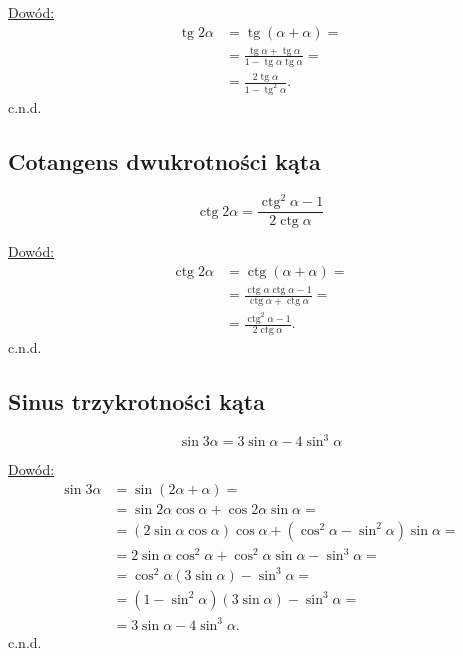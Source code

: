 \documentclass[12pt,a4paper,fleqn]{article}
\DeclareMathOperator{\tg}{tg}
\DeclareMathOperator{\ctg}{ctg}
\begin{document}
		\underline{Dowód:} \noindent
		\begin{align*}
		\tg2\alpha &= \tg(\alpha+\alpha)= \\
				   &= \frac{\tg \alpha + \tg \alpha}{1 - \tg \alpha \tg \alpha} =\\
				   &=\frac{2\tg \alpha}{1 - \tg^2 \alpha}.
		\end{align*}
		c.n.d.

		\subsection{Cotangens dwukrotności kąta}
		\begin{equation*}
			\ctg2\alpha = \frac{\ctg^2\alpha-1}{2\ctg\alpha}
		\end{equation*}
		
		\underline{Dowód:} \noindent
		\begin{align*}
			\ctg2\alpha &= \ctg(\alpha+\alpha) =\\
						&= \frac{\ctg\alpha\ctg\alpha-1}{\ctg\alpha+\ctg\alpha} =\\
						&= \frac{\ctg^2\alpha-1}{2\ctg\alpha}.
		\end{align*}
		c.n.d.
		
		\subsection{Sinus trzykrotności kąta}
		\begin{equation*}
			\sin3\alpha = 3\sin\alpha -4\sin^3\alpha
		\end{equation*}
		
		\underline{Dowód:} \noindent
		\begin{align*}
			\sin3\alpha &= \sin(2\alpha+\alpha) = \\
						  &= \sin2\alpha\cos\alpha+\cos 2\alpha\sin\alpha =\\
						  &= (2\sin\alpha\cos\alpha)\cos\alpha + (\cos^2\alpha-\sin^2\alpha)\sin\alpha = \\
						  &= 2\sin\alpha\cos^2\alpha+\cos^2\alpha\sin\alpha-\sin^3\alpha =\\
						  &= \cos^2\alpha(3\sin\alpha) - \sin^3\alpha = \\
						  &= (1-\sin^2\alpha)(3\sin\alpha) - \sin^3\alpha =\\
						  &= 3\sin\alpha -4\sin^3\alpha.
		\end{align*}
		c.n.d.
\end{document}

